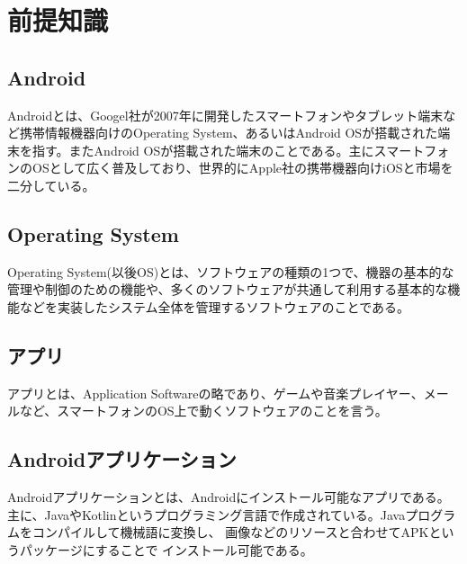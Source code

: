\newpage
\section{前提知識}


\subsection{Android}
Androidとは、Googel社が2007年に開発したスマートフォンやタブレット端末など携帯情報機器向けのOperating System、あるいはAndroid OSが搭載された端末を指す。またAndroid OSが搭載された端末のことである。主にスマートフォンのOSとして広く普及しており、世界的にApple社の携帯機器向けiOSと市場を二分している。


\subsection{Operating System}
Operating System(以後OS)とは、ソフトウェアの種類の1つで、機器の基本的な管理や制御のための機能や、多くのソフトウェアが共通して利用する基本的な機能などを実装したシステム全体を管理するソフトウェアのことである。


\subsection{アプリ}
アプリとは、Application Softwareの略であり、ゲームや音楽プレイヤー、メールなど、スマートフォンのOS上で動くソフトウェアのことを言う。


\subsection{Androidアプリケーション}
Androidアプリケーションとは、Androidにインストール可能なアプリである。
主に、JavaやKotlinというプログラミング言語で作成されている。Javaプログラムをコンパイルして機械語に変換し、
画像などのリソースと合わせてAPKというパッケージにすることで インストール可能である。


